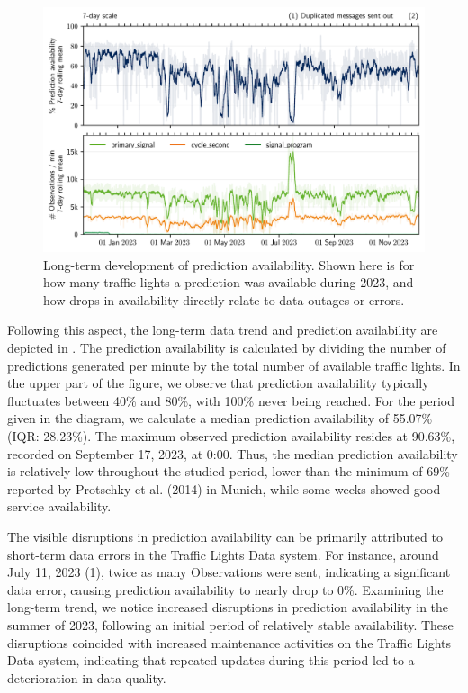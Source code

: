 \begin{figure}[t]
    \centering
    \includegraphics[width=\linewidth]{images/monitoring-availability.pdf}
    \caption{Long-term development of prediction availability. Shown here is for how many traffic lights a prediction was available during 2023, and how drops in availability directly relate to data outages or errors.}\label{fig:monitoring-availability}
\end{figure}

Following this aspect, the long-term data trend and prediction availability are depicted in . The prediction availability is calculated by dividing the number of predictions generated per minute by the total number of available traffic lights. In the upper part of the figure, we observe that prediction availability typically fluctuates between 40\% and 80\%, with 100\% never being reached. For the period given in the diagram, we calculate a median prediction availability of 55.07\% (IQR: 28.23\%). The maximum observed prediction availability resides at 90.63\%, recorded on September 17, 2023, at 0:00. Thus, the median prediction availability is relatively low throughout the studied period, lower than the minimum of 69\% reported by Protschky et al. (2014) \cite{protschky_extensive_2014, protschky_adaptive_2014} in Munich, while some weeks showed good service availability.

The visible disruptions in prediction availability can be primarily attributed to short-term data errors in the Traffic Lights Data system. For instance, around July 11, 2023 (1), twice as many Observations were sent, indicating a significant data error, causing prediction availability to nearly drop to 0\%. Examining the long-term trend, we notice increased disruptions in prediction availability in the summer of 2023, following an initial period of relatively stable availability. These disruptions coincided with increased maintenance activities on the Traffic Lights Data system, indicating that repeated updates during this period led to a deterioration in data quality. 

